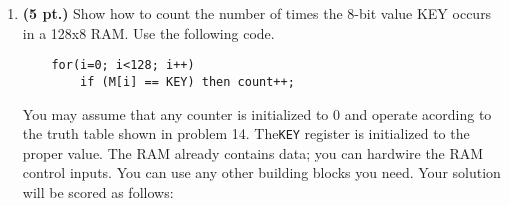 \documentclass{article}
\begin{document}
\begin{enumerate}
\pagebreak
\item {\bf (5 pt.)} Show how to count the number of times the 8-bit
value KEY occurs in a 128x8 RAM.  Use the following code.
\begin{verbatim}
    for(i=0; i<128; i++)
        if (M[i] == KEY) then count++;
\end{verbatim}
You may assume that any counter is initialized to 0 and
operate acording to the truth table shown in problem 14. 
The\verb+KEY+ register is initialized to the proper value.
The RAM already contains data; you can hardwire the RAM 
control inputs.  You can use any other building blocks you 
need.  Your solution will be scored as follows:




\end{enumerate}
\end{document}
